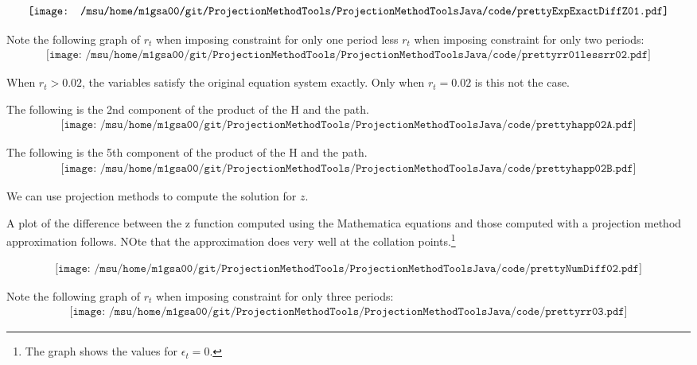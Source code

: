 \documentclass[12pt]{article}
\begin{document}
\begin{gather*}
  \vcenter{\hbox{\texttt{[image: /msu/home/m1gsa00/git/ProjectionMethodTools/ProjectionMethodToolsJava/code/prettyExpExactDiffZ01.pdf]}}}\\
\end{gather*}





Note the following graph of $r_t$ when imposing constraint for only one period
less $r_t$ when imposing constraint for only two periods:
\begin{gather*}
\texttt{[image: /msu/home/m1gsa00/git/ProjectionMethodTools/ProjectionMethodToolsJava/code/prettyrr01lessrr02.pdf]}
\end{gather*}


When $r_t>0.02$, the variables satisfy the original equation system exactly.
Only when $r_t=0.02$ is this not the case.


The following is the 2nd component of the product of the H and the path.
\begin{gather*}
\texttt{[image: /msu/home/m1gsa00/git/ProjectionMethodTools/ProjectionMethodToolsJava/code/prettyhapp02A.pdf]}
\end{gather*}

The following is the 5th component of the product of the H and the path.
\begin{gather*}
\texttt{[image: /msu/home/m1gsa00/git/ProjectionMethodTools/ProjectionMethodToolsJava/code/prettyhapp02B.pdf]}
\end{gather*}


We can use projection methods to compute the solution for $z$.

A plot of the difference between the z function computed using the Mathematica equations and those computed with a projection method approximation follows. NOte that the approximation does very well at the collation points.\footnote{The graph shows the values for $\epsilon_t=0$.}


\begin{gather*}
\texttt{[image: /msu/home/m1gsa00/git/ProjectionMethodTools/ProjectionMethodToolsJava/code/prettyNumDiff02.pdf]}
\end{gather*}




Note the following graph of $r_t$ when imposing constraint for only three
 periods:
\begin{gather*}
\texttt{[image: /msu/home/m1gsa00/git/ProjectionMethodTools/ProjectionMethodToolsJava/code/prettyrr03.pdf]}
\end{gather*}
\end{document}
